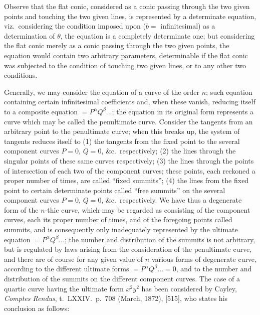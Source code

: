 \documentclass[11pt]{article}
\begin{document}
Observe that the flat conic, considered as a conic passing through the two
given points and touching the two given lines, is represented by a
determinate equation, viz.\ considering the condition imposed upon
($b = $ infinitesimal) as a determination of $\theta$, the equation is a
completely determinate one; but considering the flat conic merely as a conic
passing through the two given points, the equation would contain two
arbitrary parameters, determinable if the flat conic was subjected to the
condition of touching two given lines, or to any other two conditions.

Generally, we may consider the equation of a curve of the order $n$; such
equation containing certain infinitesimal coefficients and, when these
vanish, reducing itself to a composite equation $= P^{\alpha} Q^{\beta}\dots$;
the equation in its original form represents a curve which may be called the
penultimate curve. Consider the tangents from an arbitrary point to the
penultimate curve; when this breaks up, the system of tangents reduces itself
to (1) the tangents from the fixed point to the several component curves
$P = 0$, $Q = 0$, \&c.\ respectively; (2) the lines through the singular
points of these same curves respectively; (3) the lines through the points
of intersection of each two of the component curves; these points, each
reckoned a proper number of times, are called ``fixed summits''; (4) the
lines from the fixed point to certain determinate points called ``free
summits'' on the several component curves $P = 0$, $Q = 0$, \&c.\
respectively. We have thus a degenerate form of the $n$-thic curve, which
may be regarded as consisting of the component curves, each its proper
number of times, and of the foregoing points called summits, and is
consequently only inadequately represented by the ultimate equation
$= P^{\alpha} Q^{\beta}\dots$; the number and distribution of the summits is
not arbitrary, but is regulated by laws arising from the consideration of
the penultimate curve, and there are of course for any given value of $n$
various forms of degenerate curve, according to the different ultimate forms
$= P^{\alpha} Q^{\beta}\dots = 0$, and to the number and distribution of the
summits on the different component curves. The case of a quartic curve
having the ultimate form $x^{2} y^{2}$ has been considered by Cayley,
\emph{Comptes Rendus}, t.\ LXXIV.\ p.\ 708 (March, 1872), [515], who states
his conclusion as follows:
\end{document}
